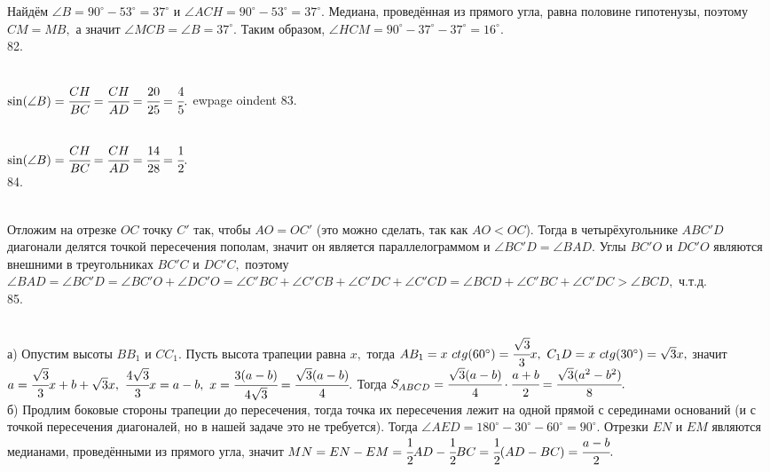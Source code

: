 Найдём $\angle B=90^\circ-53^\circ=37^\circ$ и $\angle ACH=90^\circ-53^\circ=37^\circ.$ Медиана, проведённая из прямого угла, равна половине гипотенузы, поэтому $CM=MB,$ а значит $\angle MCB=\angle B=37^\circ.$ Таким образом, $\angle HCM=90^\circ-37^\circ-37^\circ=16^\circ.$\\
82. \begin{figure}[ht!]
\end{figure}\\
$\sin(\angle B)=\cfrac{CH}{BC}=\cfrac{CH}{AD}=\cfrac{20}{25}=\cfrac{4}{5}.$
ewpage
oindent
83. \begin{figure}[ht!]
\end{figure}\\
$\sin(\angle B)=\cfrac{CH}{BC}=\cfrac{CH}{AD}=\cfrac{14}{28}=\cfrac{1}{2}.$\\
84. \begin{figure}[ht!]
\end{figure}\\
Отложим на отрезке $OC$ точку $C'$ так, чтобы $AO=OC'$ (это можно сделать, так как $AO<OC$). Тогда в четырёхугольнике $ABC'D$ диагонали делятся точкой пересечения пополам, значит он является параллелограммом и $\angle BC'D=\angle BAD.$ Углы $BC'O$ и $DC'O$ являются внешними в треугольниках $BC'C$ и $DC'C,$ поэтому $\angle BAD=\angle BC'D=\angle BC'O+\angle DC'O=\angle C'BC+\angle C'CB+\angle C'DC+\angle C'CD=\angle BCD+\angle C'BC+\angle C'DC>\angle BCD,$ ч.т.д.\\
85. \begin{figure}[ht!]
\end{figure}\\
а) Опустим высоты $BB_1$ и $CC_1.$ Пусть высота трапеции равна $x,$ тогда $AB_1=x\ ctg(60^\circ)=\cfrac{\sqrt{3}}{3}x,\ C_1D=x\ ctg(30^\circ)=\sqrt{3}x,$ значит $a=
\cfrac{\sqrt{3}}{3}x+b+\sqrt{3}x,\ \cfrac{4\sqrt{3}}{3}x=a-b,\ x=\cfrac{3(a-b)}{4\sqrt{3}}=\cfrac{\sqrt{3}(a-b)}{4}.$ Тогда
$S_{ABCD}=\cfrac{\sqrt{3}(a-b)}{4}\cdot\cfrac{a+b}{2}=\cfrac{\sqrt{3}(a^2-b^2)}{8}.$\\
б) Продлим боковые стороны трапеции до пересечения, тогда точка их пересечения лежит на одной прямой с серединами оснований (и с точкой пересечения диагоналей, но в нашей задаче это не требуется). Тогда $\angle AED=180^\circ-30^\circ-60^\circ=90^\circ.$ Отрезки $EN$ и $EM$ являются медианами, проведёнными из прямого угла, значит $MN=EN-EM=\cfrac{1}{2}AD-\cfrac{1}{2}BC=\cfrac{1}{2}(AD-BC)=\cfrac{a-b}{2}.$\\

